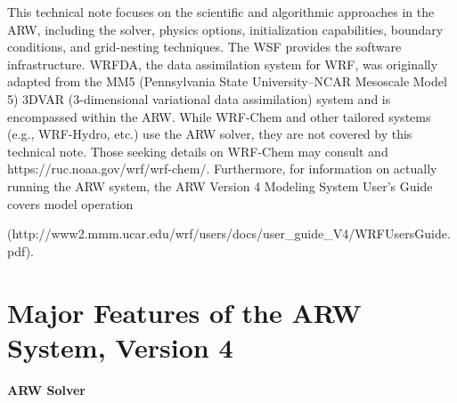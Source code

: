 This technical note focuses on the scientific and algorithmic 
approaches in the ARW, including the solver, physics options,
initialization capabilities, boundary conditions, and grid-nesting techniques.  
The WSF provides the software infrastructure.  
WRFDA, the data assimilation system for WRF, was  
originally adapted from the MM5 
(Pennsylvania State University--NCAR Mesoscale Model 5) 
3DVAR (3-dimensional variational data assimilation) system 
\citep{barker04} and is encompassed within the ARW.
While WRF-Chem and other tailored systems 
(e.g., WRF-Hydro, etc.) use the ARW solver, they are 
not covered by this technical note.  Those seeking details on 
WRF-Chem may consult \citet{Grelletal05} and 
https://ruc.noaa.gov/wrf/wrf-chem/.  Furthermore, for information on 
actually running the ARW system, the ARW Version 4 Modeling System User's Guide
covers model operation
 
{\noindent(http://www2.mmm.ucar.edu/wrf/users/docs/user\_guide\_V4/WRFUsersGuide.pdf).  }

\section {Major Features of the ARW System, Version 4}

\vskip 12pt
{\noindent\bf ARW Solver}
\vskip 12pt

